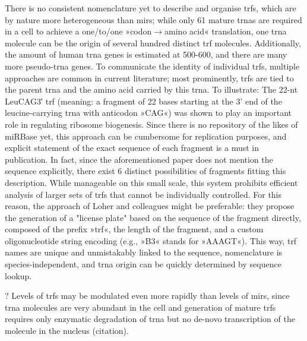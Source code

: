 There is no consistent nomenclature yet to describe and organise \acp{trf}, which are by nature more heterogeneous than \acp{mir}; while only 61 mature \acp{trna} are required in a cell to achieve a one\-/to\-/one »codon$\to$amino acid« translation, one \ac{trna} molecule can be the origin of several hundred distinct \ac{trf} molecules. Additionally, the amount of human \ac{trna} genes is estimated at 500-600\cite{Parisien2013}, and there are many more pseudo-\ac{trna} genes. To communicate the identity of individual \acp{trf}, multiple approaches are common in current literature; most prominently, \acp{trf} are tied to the parent \ac{trna} and the amino acid carried by this \ac{trna}. To illustrate: The 22-nt LeuCAG3′ \ac{trf} (meaning: a fragment of 22 bases starting at the 3' end of the leucine-carrying \ac{trna} with anticodon »CAG«) was shown to play an important role in regulating ribosome biogenesis\cite{Kim2017}. Since there is no repository of the likes of miRBase yet, this approach can be cumbersome for replication purposes, and explicit statement of the exact sequence of each fragment is a must in publication. In fact, since the aforementioned paper does not mention the sequence explicitly, there exist 6 distinct possibilities of fragments fitting this description. While manageable on this small scale, this system prohibits efficient analysis of larger sets of \acp{trf} that cannot be individually controlled. For this reason, the approach of Loher and colleagues\cite{Loher2017} might be preferable: they propose the generation of a "license plate" based on the sequence of the fragment directly, composed of the prefix »\ac{trf}«, the length of the fragment, and a custom oligonucleotide string encoding (e.g., »B3« stands for »AAAGT«). This way, \ac{trf} names are unique and unmistakably linked to the sequence, nomenclature is species-independent, and \ac{trna} origin can be quickly determined by sequence lookup.


? Levels of \acp{trf} may be modulated even more rapidly than levels of \acp{mir}, since \ac{trna} molecules are very abundant in the cell and generation of mature \acp{trf} requires only enzymatic degradation of \ac{trna} but no de-novo transcription of the molecule in the nucleus (citation).

